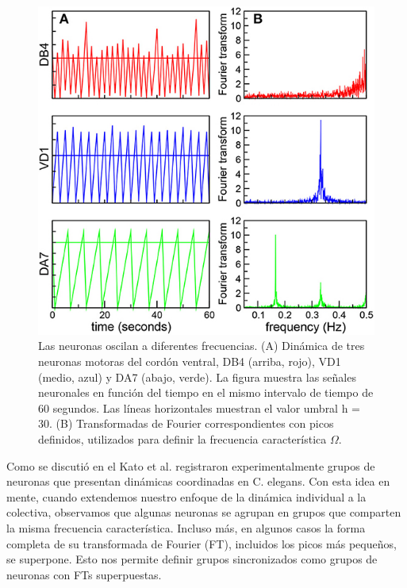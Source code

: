  \begin{figure}[h!]
	\centering\includegraphics[width=\imsize]{sincronia1.jpg}
	\caption[ Las neuronas oscilan a diferentes frecuencias.]{Las neuronas oscilan a diferentes frecuencias. (A) Dinámica de tres neuronas motoras del cordón ventral, DB4 (arriba, rojo), VD1 (medio, azul) y DA7 (abajo, verde). La figura muestra las señales neuronales en función del tiempo en el mismo intervalo de tiempo de 60 segundos. Las líneas horizontales muestran el valor umbral h = 30. (B) Transformadas de Fourier correspondientes con picos definidos, utilizados para definir la frecuencia característica $\Omega$.}\label{fig:sincronia_1}
\end{figure}

Como se discutió en el   Kato et al.\cite{kato_global_2015} registraron experimentalmente grupos de neuronas que presentan dinámicas coordinadas en C. elegans.  Con esta idea en mente, cuando extendemos nuestro enfoque de la dinámica individual a la colectiva, observamos que algunas neuronas se agrupan en grupos que comparten la misma frecuencia característica. Incluso más, en algunos casos la forma completa de su transformada de Fourier (FT), incluidos los picos más pequeños, se superpone. Esto nos permite definir grupos sincronizados como grupos de neuronas con FTs superpuestas.

